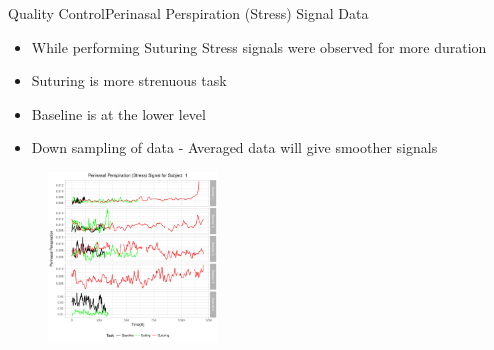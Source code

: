 \documentclass{beamer}
\begin{document}
\begin{frame}{Quality Control}{Perinasal Perspiration (Stress) Signal Data }

  \begin{itemize}
  \item {
   While performing Suturing Stress signals were observed for more duration }
  \item {Suturing is more strenuous task }
  \item {Baseline is at the lower level }
  \item {Down sampling of data - Averaged data will give smoother signals }
      \end{itemize}
    \begin{figure}
	\includegraphics[width=0.4\textwidth]{01_Perinasal_Perspiration.pdf}
	\end{figure}
 \end{frame}
 
\end{document}
